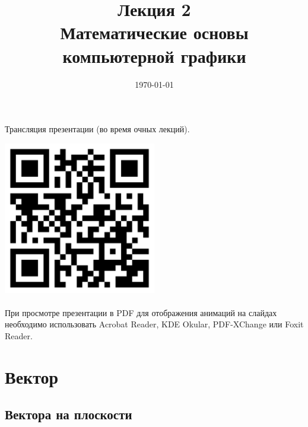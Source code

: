 \documentclass[10pt]{beamer}
\date{\today}
\title{Лекция 2 \\Математические основы компьютерной графики}
\begin{document}
	 

    
    \begin{frame}[plain]
    	
    	
    	\centering
    	Трансляция презентации (во время очных лекций).     
    		
    	\includegraphics[width=0.5\textwidth]{qr.png} \\ ~ \\
    	
    	
    	При просмотре презентации в PDF для отображения анимаций на слайдах необходимо использовать Acrobat Reader, KDE Okular, PDF-XChange или Foxit Reader.

    \end{frame}
	
	
	\frame{\maketitle}
	
	
	
	\begin{frame}
		\tableofcontents
	\end{frame}
	
	\section{Вектор}
	\subsection{Вектора на плоскости}
	
	\frame{\sectionpage}
	
\end{document}
